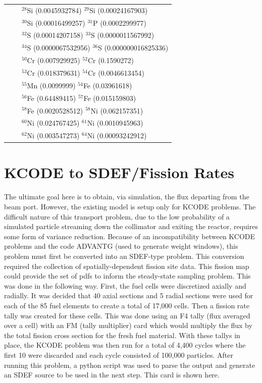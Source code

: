 \begin{table}[h]
\begin{tabular}{ r c l }
& &            $^{28}$Si (0.0045932784) $^{29}$Si  (0.00024167903) \\
& &            $^{30}$Si  (0.00016499257) $^{31}$P  (0.0002299977) \\
& &            $^{32}$S  (0.00014207158)  $^{33}$S  (0.0000011567992) \\
& &            $^{34}$S  (0.0000067532956) $^{36}$S  (0.000000016825336) \\
& &            $^{50}$Cr  (0.007929925)   $^{52}$Cr  (0.1590272) \\
& &            $^{53}$Cr  (0.018379631)   $^{54}$Cr  (0.0046613454) \\
& &            $^{55}$Mn  (0.0099999)   $^{54}$Fe  (0.03961618) \\
& &            $^{56}$Fe  (0.64489415)   $^{57}$Fe  (0.015159803) \\
& &            $^{58}$Fe  (0.0020528512)  $^{58}$Ni  (0.062157351) \\
& &            $^{60}$Ni  (0.024767425)  $^{61}$Ni  (0.0010945963) \\
& &            $^{62}$Ni  (0.003547273)  $^{64}$Ni  (0.00093242912) \\
\bottomrule
\end{tabular}
\end{table}

\clearpage

\section{KCODE to SDEF/Fission Rates}

The ultimate goal here is to obtain, via simulation, the flux departing from the beam port.
However, the existing model is setup only for KCODE problems.
The difficult nature of this transport problem, due to the low probability of a simulated particle streaming down the collimator and exiting the reactor, requires some form of variance reduction.
Because of an incompatibility between KCODE problems and the code ADVANTG (used to generate weight windows), this problem must first be converted into an SDEF-type problem.
This conversion required the collection of spatially-dependent fission site data.
This fission map could provide the set of pdfs to inform the steady-state sampling problem.
This was done in the following way.
First, the fuel cells were discretized axially and radially.
It was decided that 40 axial sections and 5 radial sections were used for each of the 85 fuel elements to create a total of 17,000 cells.
Then a fission rate tally was created for these cells.
This was done using an F4 tally (flux averaged over a cell) with an FM (tally multiplier) card which would multiply the flux by the total fission cross section for the fresh fuel material.
With these tallys in place, the KCODE problem was then run for a total of 4,400 cycles where the first 10 were discarded and each cycle consisted of 100,000 particles.
After running this problem, a python script was used to parse the output and generate an SDEF source to be used in the next step.
This card is shown here.


